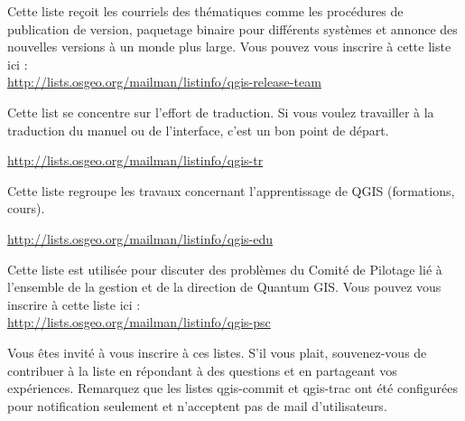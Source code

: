 Cette liste reçoit les courriels des thématiques comme les procédures de
publication de version, paquetage binaire pour différents systèmes et annonce
des nouvelles versions à un monde plus large. Vous pouvez vous inscrire à cette
liste ici :\\
\url{http://lists.osgeo.org/mailman/listinfo/qgis-release-team}


Cette list se concentre sur l'effort de traduction. Si vous voulez travailler à la traduction du manuel ou de l'interface, c'est un bon point de départ. 

\url{http://lists.osgeo.org/mailman/listinfo/qgis-tr}


Cette liste regroupe les travaux concernant l'apprentissage de QGIS (formations, cours).

\url{http://lists.osgeo.org/mailman/listinfo/qgis-edu}

Cette liste est utilisée pour discuter des problèmes du Comité de Pilotage lié à
l'ensemble de la gestion et de la direction de Quantum GIS. Vous pouvez vous
inscrire à cette liste ici :\\
\url{http://lists.osgeo.org/mailman/listinfo/qgis-psc}

Vous êtes invité à vous inscrire à ces listes. S'il vous plait, souvenez-vous de
contribuer à la liste en répondant à des questions et en partageant vos
expériences. Remarquez que les listes qgis-commit et qgis-trac ont été
configurées pour notification seulement et n'acceptent pas de mail
d'utilisateurs.

